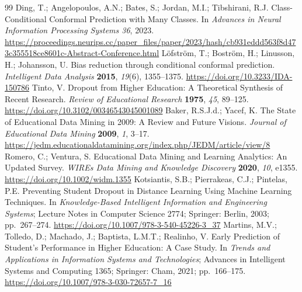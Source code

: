 \begin{thebibliography}{99}
Ding, T.; Angelopoulos, A.N.; Bates, S.; Jordan, M.I.; Tibshirani, R.J.
Class-Conditional Conformal Prediction with Many Classes.
In \emph{Advances in Neural Information Processing Systems 36}, 2023.
\url{https://proceedings.neurips.cc/paper_files/paper/2023/hash/cb931eddd563f8d473c355518ce8601c-Abstract-Conference.html}
L\"ofstr\"om, T.; Bostr\"om, H.; Linusson, H.; Johansson, U.
Bias reduction through conditional conformal prediction.
\emph{Intelligent Data Analysis} \textbf{2015}, \emph{19}(6), 1355--1375.
\url{https://doi.org/10.3233/IDA-150786}
Tinto, V.
Dropout from Higher Education: A Theoretical Synthesis of Recent Research.
\emph{Review of Educational Research} \textbf{1975}, \emph{45}, 89--125.
\url{https://doi.org/10.3102/00346543045001089}
Baker, R.S.J.d.; Yacef, K.
The State of Educational Data Mining in 2009: A Review and Future Visions.
\emph{Journal of Educational Data Mining} \textbf{2009}, \emph{1}, 3--17.
\url{https://jedm.educationaldatamining.org/index.php/JEDM/article/view/8}
Romero, C.; Ventura, S.
Educational Data Mining and Learning Analytics: An Updated Survey.
\emph{WIREs Data Mining and Knowledge Discovery} \textbf{2020}, \emph{10},
e1355.
\url{https://doi.org/10.1002/widm.1355}
Kotsiantis, S.B.; Pierrakeas, C.J.; Pintelas, P.E.
Preventing Student Dropout in Distance Learning Using Machine Learning
Techniques.
In \emph{Knowledge-Based Intelligent Information and Engineering Systems};
Lecture Notes in Computer Science 2774; Springer: Berlin, 2003; pp.~267--274.
\url{https://doi.org/10.1007/978-3-540-45226-3_37}
Martins, M.V.; Tolledo, D.; Machado, J.; Baptista, L.M.T.; Realinho, V.
Early Prediction of Student's Performance in Higher Education: A Case Study.
In \emph{Trends and Applications in Information Systems and Technologies};
Advances in Intelligent Systems and Computing 1365; Springer: Cham, 2021;
pp.~166--175.
\url{https://doi.org/10.1007/978-3-030-72657-7_16}


\end{thebibliography}
